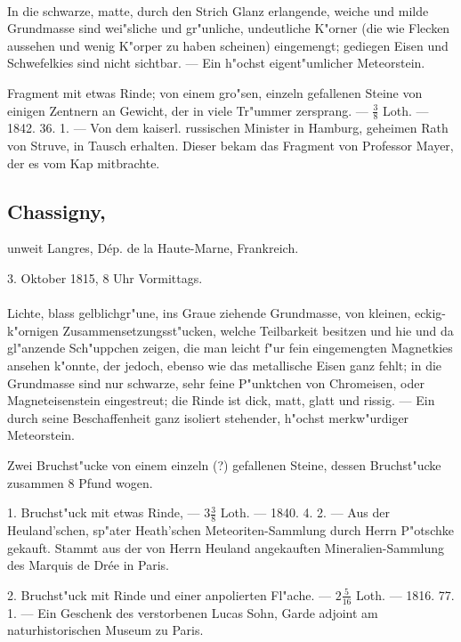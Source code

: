 \documentclass[a4paper, 11pt, oneside, polutonikogreek, german]{article}
\begin{document}
\paragraph{}
In die schwarze, matte, durch den Strich Glanz erlangende, weiche und milde Grundmasse sind wei"sliche und gr"unliche, undeutliche K"orner (die wie Flecken aussehen und wenig K"orper zu haben scheinen) eingemengt; gediegen Eisen und Schwefelkies sind nicht sichtbar. --- Ein h"ochst eigent"umlicher Meteorstein.

Fragment mit etwas Rinde; von einem gro"sen, einzeln gefallenen Steine von einigen Zentnern an Gewicht, der in viele Tr"ummer zersprang. --- $\frac{3}{8}$ Loth. --- 1842. 36. 1. --- Von dem kaiserl. russischen Minister in Hamburg, geheimen Rath von Struve, in Tausch erhalten. Dieser bekam das Fragment von Professor Mayer, der es vom Kap mitbrachte.
\subsection[Chassigny.]{Chassigny,}
\begin{center}
\small
unweit Langres, Dép. de la Haute-Marne, Frankreich.

3. Oktober 1815, 8 Uhr Vormittags.
\end{center}
\paragraph{}
Lichte, blass gelblichgr"une, ins Graue ziehende Grundmasse, von kleinen, eckig-k"ornigen Zusammensetzungsst"ucken, welche Teilbarkeit besitzen und hie und da gl"anzende Sch"uppchen zeigen, die man leicht f"ur fein eingemengten Magnetkies ansehen k"onnte, der jedoch, ebenso wie das metallische Eisen ganz fehlt; in die Grundmasse sind nur schwarze, sehr feine P"unktchen von Chromeisen, oder Magneteisenstein eingestreut; die Rinde ist dick, matt, glatt und rissig. --- Ein durch seine Beschaffenheit ganz isoliert stehender, h"ochst merkw"urdiger Meteorstein.

Zwei Bruchst"ucke von einem einzeln (?) gefallenen Steine, dessen Bruchst"ucke zusammen 8 Pfund wogen.

1. Bruchst"uck mit etwas Rinde, --- $3\frac{3}{8}$ Loth. --- 1840. 4. 2. --- Aus der Heuland’schen, sp"ater Heath’schen Meteoriten-Sammlung durch Herrn P"otschke gekauft. Stammt aus der von Herrn Heuland angekauften Mineralien-Sammlung des Marquis de Drée in Paris.

2. Bruchst"uck mit Rinde und einer anpolierten Fl"ache. --- $2\frac{5}{16}$ Loth. --- 1816. 77. 1. --- Ein Geschenk des verstorbenen Lucas Sohn, Garde adjoint am naturhistorischen Museum zu Paris.
\end{document}
